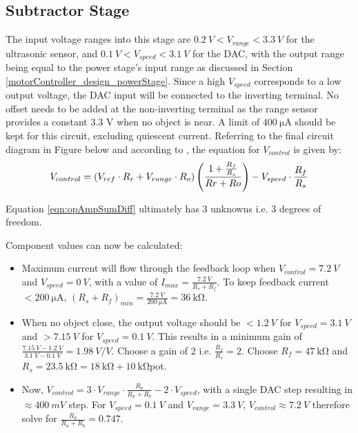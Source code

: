 \subsection{Subtractor Stage}
The input voltage ranges into this stage are $\SI{0.2}{V} < V_{range} < \SI{3.3}{V}$ for the ultrasonic sensor, and $\SI{0.1}{V} < V_{speed} < \SI{3.1}{V}$ for the DAC,
with the output range being equal to the power stage's input range as discussed in Section \ref{motorController_design_powerStage}. Since a high $V_{speed}$ corresponds to
a low output voltage, the DAC input will be connected to the inverting terminal. No offset needs to be added at the non-inverting terminal
as the range sensor provides a constant 3.3 V when no object is near. A limit of $\SI{400}{\micro\ampere}$ should be kept for this circuit, excluding quiescent current.
Referring to the final circuit diagram in Figure below and according to \cite{opAmpSumDiff}, the equation for $V_{control}$ is given by:
\begin{equation}{\label{eqn:opAmpSumDiff}}
    V_{control} = \left(V_{ref} \cdot R_r + V_{range} \cdot R_o \right) \left(\frac{1 + \frac{R_f}{R_s}}{Rr + Ro} \right) - V_{speed} \cdot \frac{R_f}{R_s}    
\end{equation}

\noindent Equation \ref{eqn:opAmpSumDiff} ultimately has 3 unknowns i.e. 3 degrees of freedom.

\noindent Component values can now be calculated:
\begin{itemize}
    \item Maximum current will flow through the feedback loop when $V_{control} = \SI{7.2}{V}$ and $V_{speed} = \SI{0}{V}$, with a value of $I_{max} = \frac{\SI{7.2}{V}}{R_s + R_f}$.
          To keep feedback current $< \SI{200}{\micro\ampere}$, $(R_s + R_f)_{min} = \frac{\SI{7.2}{V}}{\SI{200}{\micro\ampere}} = \SI{36}{\kilo\ohm}$.
    \item When no object close, the output voltage should be $< \SI{1.2}{V}$ for $V_{speed} = \SI{3.1}{V}$ and $> \SI{7.15}{V}$ for $V_{speed} = \SI{0.1}{V}$. This results
          in a minimum gain of $\frac{\SI{7.15}{V} - \SI{1.2}{V}}{\SI{3.1}{V} - \SI{0.1}{V}} = \SI{1.98}{V/V}$. Choose a gain of 2 i.e. $\frac{R_f}{R_s} = 2$.
          Choose $R_f = \SI{47}{\kilo\ohm}$ and $R_s = \SI{23.5}{\kilo\ohm} = \SI{18}{\kilo\ohm} + \SI{10}{\kilo\ohm}$pot.
    \item Now, $V_{control} = 3 \cdot V_{range} \cdot \frac{R_a}{R_a + R_b} - 2 \cdot V_{speed}$, with a single DAC step resulting in $\approx \SI{400}{mV}$ step.
          For $V_{speed} = \SI{0.1}{V}$ and $V_{range} = \SI{3.3}{V}$, $V_{control} \approx \SI{7.2}{V}$ therefore solve for $\frac{R_a}{R_a + R_b} = 0.747$.
\end{itemize}